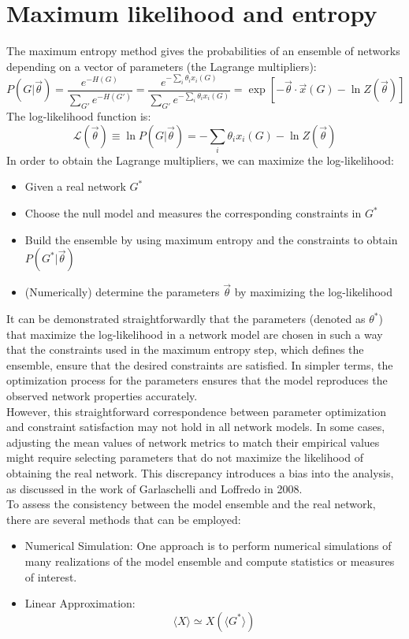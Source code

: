 \section{Maximum likelihood and entropy}
The maximum entropy method gives the probabilities of an ensemble of networks depending on a vector of parameters (the Lagrange multipliers):
\[
P(G| \vec{\theta}) = \frac{e^{- H(G)}}{\sum_{G'} e^{-H(G')}} = \frac{e^{-\sum_i \theta_i x_i(G)}}{\sum_{G'} e^{- \sum_i \theta_i x_i(G)}} = \exp[-\vec{\theta} \cdot \vec{x}(G) - \ln Z (\vec{\theta})]
\]
The log-likelihood function is:
\[
\mathcal{L}(\vec{\theta})\equiv \ln P(G| \vec{\theta}) = - \sum_i \theta_ix_i(G) - \ln Z(\vec{\theta})
\]
In order to obtain the Lagrange multipliers, we can maximize the log-likelihood:
\begin{itemize}
\item Given a real network $G^{\ast}$ 
\item Choose the null model and measures the corresponding constraints in $G^\ast$ 
\item Build the ensemble by using maximum entropy and the constraints to obtain $P(G^\ast|\vec{\theta})$
\item (Numerically) determine the parameters $\vec{\theta}$ by maximizing the log-likelihood
\end{itemize}
It can be demonstrated straightforwardly that the parameters (denoted as $\theta^\ast$) that maximize the log-likelihood in a network model are chosen in such a way that the constraints used in the maximum entropy step, which defines the ensemble, ensure that the desired constraints are satisfied. In simpler terms, the optimization process for the parameters ensures that the model reproduces the observed network properties accurately.\\
However, this straightforward correspondence between parameter optimization and constraint satisfaction may not hold in all network models. In some cases, adjusting the mean values of network metrics to match their empirical values might require selecting parameters that do not maximize the likelihood of obtaining the real network. This discrepancy introduces a bias into the analysis, as discussed in the work of Garlaschelli and Loffredo in 2008.\\
To assess the consistency between the model ensemble and the real network, there are several methods that can be employed:
\begin{itemize}
\item Numerical Simulation: One approach is to perform numerical simulations of many realizations of the model ensemble and compute statistics or measures of interest. 
\item Linear Approximation:
\[
\langle X \rangle \simeq X(\langle G^\ast \rangle)
\]
\end{itemize}
